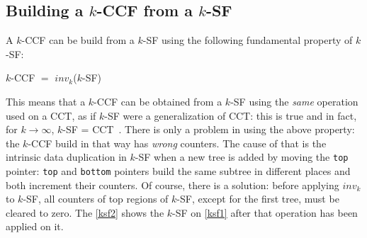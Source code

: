 \documentclass[a4paper,10pt]{report}
\begin{document}
\subsection{Building a $k$-CCF from a $k$-SF}

A $k$-CCF can be build from a $k$-SF using the following fundamental property of $k$-SF:
\begin{center}
$k$-CCF $=$ $inv_k$($k$-SF)
\end{center}
This means that a $k$-CCF can be obtained from a $k$-SF using the \emph{same} operation
used on a CCT, as if $k$-SF were a generalization of CCT: this is true and in fact, for $k\rightarrow \infty$, $k$-SF = CCT~\cite{kccf}.
There is only a problem in using the above property: the $k$-CCF build in that way has \emph{wrong} counters. The cause of that is the intrinsic data duplication in $k$-SF when a new tree is added by moving the \verb|top| pointer: \verb|top| and \verb|bottom| pointers build the same subtree in different places and both increment their counters. Of course, there is a solution: before applying $inv_k$ to $k$-SF, all counters of top regions of $k$-SF, except for the first tree, must be cleared to zero. 
The \cref{ksf2} shows the $k$-SF on \cref{ksf1} 
after that operation has been applied on it.
\end{document}
